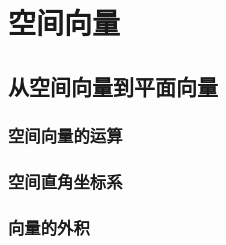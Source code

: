 \chapter{空间向量}


\section{从空间向量到平面向量}
\subsection{空间向量的运算}
\clearpage
\subsection{空间直角坐标系}
\clearpage
\subsection{向量的外积}
\clearpage
